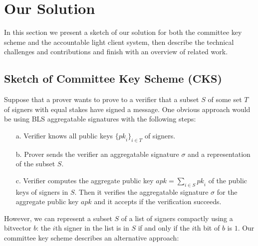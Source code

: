 \section{Our Solution}
\label{sec:sketch}
\vspace{-0.1cm}

In this section we present a sketch of our solution for both the committee key scheme and the accountable light client system,
then describe the technical challenges and contributions and finish with an overview of related work.

\vspace{-0.3cm}
\subsection{Sketch of Committee Key Scheme (CKS)}
\label{sec:lcsketch}
\vspace{-0.1cm}

\noindent Suppose that a prover wants to prove to a verifier that a subset $S$ of some set $T$ of signers with equal stakes have signed a message.
One obvious approach would be using BLS aggregatable signatures with the following steps:

\begin{itemize}
\item[a.] Verifier knows all public keys $\{\mathit{pk}_i\}_{i \in T}$ of signers.%

\item[b.] Prover sends the verifier an aggregatable signature $\sigma$ and a representation of the subset $S$.

\item[c.] Verifier computes the aggregate public key $\mathit{apk}=\sum_{i \in S} \mathit{pk}_i$ of the public keys of signers in $S$.
Then it verifies the aggregatable signature $\sigma$ for the aggregate public key $\mathit{apk}$ and it accepts if the verification succeeds.
\end{itemize}

\noindent However, we can represent a subset $S$ of a list of signers compactly using a bitvector $b$:
the $i$th signer in the list is in $S$ if and only if the $i$th bit of $b$ is $1$. Our committee key scheme describes an alternative approach:

